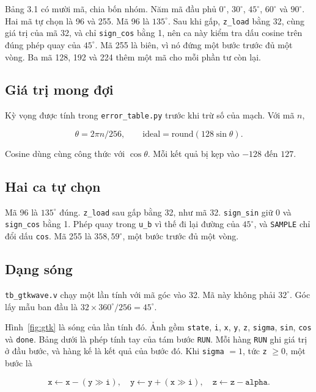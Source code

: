 \documentclass[12pt,a4paper]{article}
\begin{document}
Bảng 3.1 có mười mã, chia bốn nhóm. Năm mã đầu phủ \(0^\circ\), \(30^\circ\), \(45^\circ\), \(60^\circ\) và \(90^\circ\). Hai mã tự chọn là 96 và 255. Mã 96 là \(135^\circ\). Sau khi gấp, \texttt{z\_load} bằng 32, cùng giá trị của mã 32, và chỉ \texttt{sign\_cos} bằng 1, nên ca này kiểm tra dấu cosine trên đúng phép quay của \(45^\circ\). Mã 255 là biên, vì nó đứng một bước trước đủ một vòng. Ba mã 128, 192 và 224 thêm một mã cho mỗi phần tư còn lại.

\subsection{Giá trị mong đợi}

Kỳ vọng được tính trong \texttt{error\_table.py} trước khi trừ số của mạch. Với mã \(n\),

\[
\theta = 2\pi n / 256, \qquad \mathrm{ideal} = \mathrm{round}(128\sin\theta).
\]

Cosine dùng cùng công thức với \(\cos\theta\). Mỗi kết quả bị kẹp vào \(-128\) đến \(127\).

\subsection{Hai ca tự chọn}

Mã 96 là \(135^\circ\) đúng. \texttt{z\_load} sau gấp bằng 32, như mã 32. \texttt{sign\_sin} giữ 0 và \texttt{sign\_cos} bằng 1. Phép quay trong \texttt{u\_b} vì thế đi lại đường của \(45^\circ\), và \texttt{SAMPLE} chỉ đổi dấu \texttt{cos}. Mã 255 là \(358{,}59^\circ\), một bước trước đủ một vòng.

\subsection{Dạng sóng}

\texttt{tb\_gtkwave.v} chạy một lần tính với mã góc vào 32. Mã này không phải \(32^\circ\). Góc lấy mẫu ban đầu là \(32 \times 360^\circ/256 = 45^\circ\).

Hình~\ref{fig:gtk} là sóng của lần tính đó. Ảnh gồm \texttt{state}, \texttt{i}, \texttt{x}, \texttt{y}, \texttt{z}, \texttt{sigma}, \texttt{sin}, \texttt{cos} và \texttt{done}. Bảng dưới là phép tính tay của tám bước \texttt{RUN}. Mỗi hàng \texttt{RUN} ghi giá trị ở đầu bước, và hàng kế là kết quả của bước đó. Khi \texttt{sigma} \(= 1\), tức \texttt{z} \(\ge 0\), một bước là

\[
\texttt{x} \leftarrow \texttt{x} - (\texttt{y} \gg \texttt{i}),\quad
\texttt{y} \leftarrow \texttt{y} + (\texttt{x} \gg \texttt{i}),\quad
\texttt{z} \leftarrow \texttt{z} - \texttt{alpha}.
\]
\end{document}
